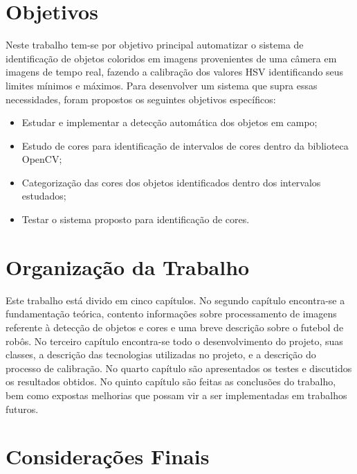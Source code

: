 \section{Objetivos}
Neste trabalho tem-se por objetivo principal automatizar o sistema de identificação de objetos 
coloridos em imagens provenientes de uma câmera em imagens de tempo real, fazendo a calibração dos valores HSV identificando seus limites mínimos e máximos.  
Para desenvolver um sistema que supra essas necessidades, foram propostos os seguintes objetivos específicos:

\begin{itemize}
	
	\item Estudar e implementar a detecção automática dos objetos em campo; 
	\item Estudo de cores para identificação de intervalos de cores dentro da biblioteca OpenCV;
	\item Categorização das cores dos objetos identificados dentro dos intervalos estudados;
	\item Testar o sistema proposto para identificação de cores.
	
	
\end{itemize}

\newpage

\section{Organização da Trabalho} \label{Sec:Organizacao}

Este trabalho está divido em cinco capítulos. No segundo capítulo encontra-se a fundamentação teórica, contento informações sobre processamento de imagens referente à detecção de objetos e cores e uma breve descrição sobre o futebol de robôs. No terceiro capítulo encontra-se todo o desenvolvimento do projeto, suas classes, a descrição das tecnologias utilizadas no projeto, e a descrição do processo de calibração. No quarto capítulo são apresentados os testes e discutidos os resultados obtidos. No quinto capítulo são feitas as conclusões do trabalho, bem como expostas melhorias que possam vir a ser implementadas em trabalhos futuros.

\section{Considerações Finais}
